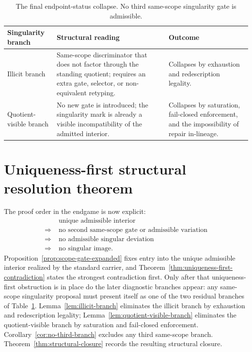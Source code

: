 \begin{table}[t]
\centering
\begin{tabular}{>{\raggedright\arraybackslash}p{} >{\raggedright\arraybackslash}p{} >{\raggedright\arraybackslash}p{}}
\toprule
\textbf{Singularity branch} & \textbf{Structural reading} & \textbf{Outcome} \\
\midrule
Illicit branch & Same-scope discriminator that does not factor through the standing quotient; requires an extra gate, selector, or non-equivalent retyping. & Collapses by exhaustion and redescription legality. \\
\addlinespace
Quotient-visible branch & No new gate is introduced; the singularity mark is already a visible incompatibility of the admitted interior. & Collapses by saturation, fail-closed enforcement, and the impossibility of repair in-lineage. \\
\bottomrule
\end{tabular}
\caption{The final endpoint-status collapse. No third same-scope singularity gate is admissible.}
\label{tab:final-dichotomy}
\end{table}

\section{Uniqueness-first structural resolution theorem}
The proof order in the endgame is now explicit:
\[
\begin{aligned}
&\text{unique admissible interior}\\
\Longrightarrow\;&\text{no second same-scope gate or admissible variation}\\
\Longrightarrow\;&\text{no admissible singular deviation}\\
\Longrightarrow\;&\text{no singular image.}
\end{aligned}
\]
Proposition~\ref{prop:scope-gate-expanded} fixes entry into the unique admissible interior realized by the standard carrier, and Theorem~\ref{thm:uniqueness-first-contradiction} states the strongest contradiction first. Only after that uniqueness-first obstruction is in place do the later diagnostic branches appear: any same-scope singularity proposal must present itself as one of the two residual branches of Table~\ref{tab:final-dichotomy}. Lemma~\ref{lem:illicit-branch} eliminates the illicit branch by exhaustion and redescription legality; Lemma~\ref{lem:quotient-visible-branch} eliminates the quotient-visible branch by saturation and fail-closed enforcement. Corollary~\ref{cor:no-third-branch} excludes any third same-scope branch. Theorem~\ref{thm:structural-closure} records the resulting structural closure.

